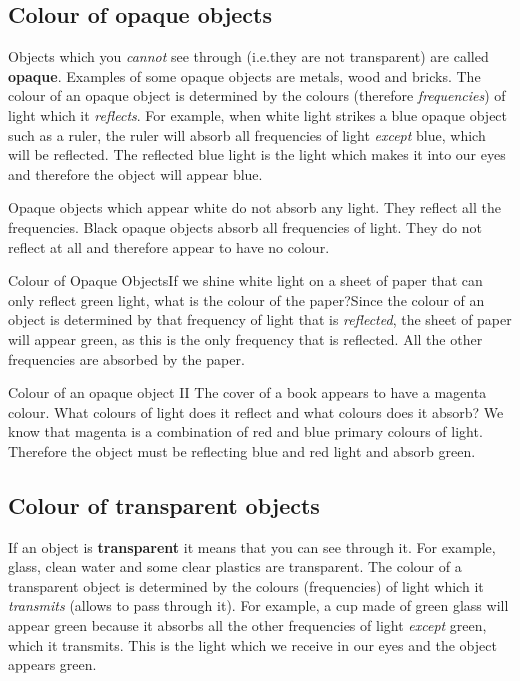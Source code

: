 \subsection{Colour of opaque objects}
Objects which you \textit{cannot} see through (i.e.\@ they are not transparent) are called \textbf{opaque}. Examples of some opaque objects are metals, wood and bricks. The colour of an opaque object is determined by the colours (therefore \textit{frequencies}) of light which it \textit{reflects}. For example, when white light strikes a blue opaque object such as a ruler, the ruler will absorb all frequencies of light \textit{except} blue, which will be reflected. The reflected blue light is the light which makes it into our eyes and therefore the object will appear blue.

Opaque objects which appear white do not absorb any light. They reflect all the frequencies.
Black opaque objects absorb all frequencies of light. They do not reflect at all and therefore appear to have no colour.

\begin{wex}
{Colour of Opaque Objects}{If we shine white light on a sheet of paper that can only reflect green light, what is the colour of the paper?}{Since the colour of an object is determined by that frequency of light that is \textit{reflected}, the sheet of paper will appear green, as this is the only frequency that is reflected. All the other frequencies are absorbed by the paper.}
\end{wex}

\begin{wex}{Colour of an opaque object II}
{The cover of a book appears to have a magenta colour. What colours of light does it reflect and what colours does it absorb?}
{We know that magenta is a combination of red and blue primary colours of light. Therefore the object must be reflecting blue and red light and absorb green. }
\end{wex}

\subsection{Colour of transparent objects}
If an object is \textbf{transparent} it means that you can see through it. For example, glass, clean water and some clear plastics are transparent. The colour of a transparent object is determined by the colours (frequencies) of light which it \textit{transmits} (allows to pass through it). For example, a cup made of green glass will appear green because it absorbs all the other frequencies of light \textit{except} green, which it transmits. This is the light which we receive in our eyes and the object appears green. 


